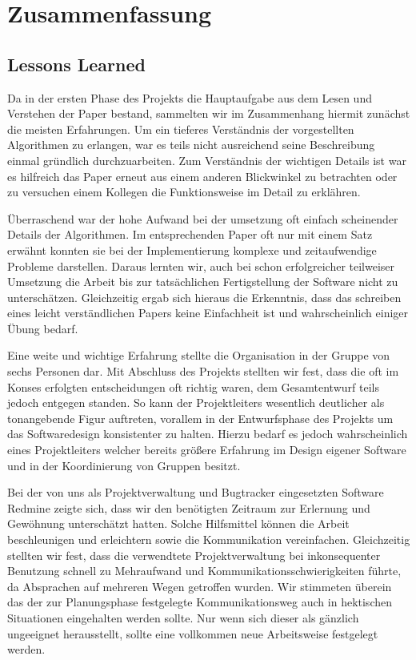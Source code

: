 \section{Zusammenfassung}

  \subsection{Lessons Learned}
  
    Da in der ersten Phase des Projekts die Hauptaufgabe aus dem Lesen und
    Verstehen der Paper bestand, sammelten wir im Zusammenhang hiermit zunächst
    die meisten Erfahrungen. Um ein tieferes Verständnis der vorgestellten
    Algorithmen zu erlangen, war es teils nicht ausreichend seine Beschreibung
    einmal gründlich durchzuarbeiten. Zum Verständnis der wichtigen Details ist
    war es hilfreich das Paper erneut aus einem anderen Blickwinkel zu
    betrachten oder zu versuchen einem Kollegen die Funktionsweise im Detail zu
    erklähren.

    Überraschend war der hohe Aufwand bei der umsetzung oft einfach scheinender
    Details der Algorithmen. Im entsprechenden Paper oft nur mit einem Satz
    erwähnt konnten sie bei der Implementierung komplexe und zeitaufwendige
    Probleme darstellen. Daraus lernten wir, auch bei schon erfolgreicher
    teilweiser Umsetzung die Arbeit bis zur tatsächlichen Fertigstellung der
    Software nicht zu unterschätzen. Gleichzeitig ergab sich hieraus die
    Erkenntnis, dass das schreiben eines leicht verständlichen Papers keine
    Einfachheit ist und wahrscheinlich einiger Übung bedarf.

    Eine weite und wichtige Erfahrung stellte die Organisation in der Gruppe von
    sechs Personen dar. Mit Abschluss des Projekts stellten wir fest, dass die
    oft im Konses erfolgten entscheidungen oft richtig waren, dem Gesamtentwurf
    teils jedoch entgegen standen. So kann der Projektleiters wesentlich
    deutlicher als tonangebende Figur auftreten, vorallem in der Entwurfsphase
    des Projekts um das Softwaredesign konsistenter zu halten. Hierzu bedarf es
    jedoch wahrscheinlich eines Projektleiters welcher bereits größere Erfahrung
    im Design eigener Software und in der Koordinierung von Gruppen besitzt.

    Bei der von uns als Projektverwaltung und Bugtracker eingesetzten Software
    Redmine zeigte sich, dass wir den benötigten Zeitraum zur Erlernung und
    Gewöhnung unterschätzt hatten. Solche Hilfsmittel können die Arbeit
    beschleunigen und erleichtern sowie die Kommunikation vereinfachen.
    Gleichzeitig stellten wir fest, dass die verwendtete Projektverwaltung bei
    inkonsequenter Benutzung schnell zu Mehraufwand und
    Kommunikationsschwierigkeiten führte, da Absprachen auf mehreren Wegen
    getroffen wurden. Wir stimmeten überein das der zur Planungsphase
    festgelegte Kommunikationsweg auch in hektischen Situationen eingehalten
    werden sollte. Nur wenn sich dieser als gänzlich ungeeignet herausstellt,
    sollte eine vollkommen neue Arbeitsweise festgelegt werden.

